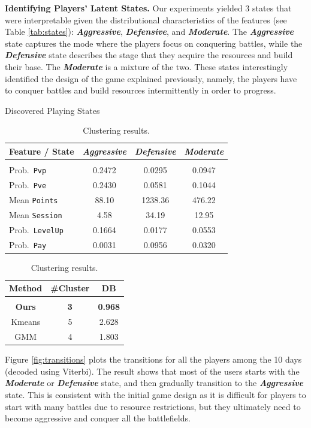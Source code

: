 {\bf Identifying Players' Latent States.} Our experiments yielded 3 states that were interpretable given the distributional characteristics of the features (see 
Table \ref{tab:states}): \textbf{\textit{Aggressive}}, 
\textbf{\textit{Defensive}}, and \textbf{\textit{Moderate}}.  The \textbf{\textit{Aggressive}} state captures 
the mode where the players focus on conquering battles, while the \textbf{\textit{Defensive}} 
state describes the stage that they acquire the resources and build their base. The \textbf{\textit{Moderate}} is a mixture
of the two. These states interestingly identified the design of the game explained previously,
namely, the players have to conquer battles and build resources intermittently in order to progress. 

\begin{table}
\parbox{.65\linewidth}{
\centering
\caption{Discovered Playing States}
\label{tab:states}
\centering
\scalebox{0.8}
{
\begin{tabular}{lccc} 
\bf Feature / State & \textbf{\textit{Aggressive}}  & \textbf{\textit{Defensive}}  &  \textbf{\textit{Moderate}}
\\ \hline \\
 Prob.\ \texttt{Pvp}     &  0.2472  & 0.0295 &  0.0947  \\
 Prob.\ \texttt{Pve}     &  0.2430  & 0.0581 &  0.1044 \\
 Mean \texttt{Points} &  88.10   & 1238.36 &  476.22 \\
 Mean \texttt{Session}&  4.58    &  34.19  & 12.95 \\
 Prob.\ \texttt{LevelUp} &  0.1664  & 0.0177  & 0.0553 \\
 Prob.\ \texttt{Pay}     &  0.0031  & 0.0956  & 0.0320 \\
\end{tabular}
}
}
\hfill
\parbox{.35\linewidth}{
\centering
\caption{Clustering results.}
\label{tab:clustering}
\begin{tabular}{ccc}
\bf Method & \bf \#Cluster & \bf DB
\\ \hline \\
{\bf Ours}     & {\bf 3}  &  {\bf 0.968} \\  
Kmeans  &  5  &  2.628 \\
GMM     &  4  &  1.803 
\end{tabular}
}
\end{table}

Figure \ref{fig:transitions} plots the transitions for all the players among the 10 days (decoded using Viterbi). 
The result shows that most of the users starts with the \textbf{\textit{Moderate}} or \textbf{\textit{Defensive}} state, 
and then gradually transition to the \textbf{\textit{Aggressive}} state. 
This is  consistent with the initial game design as  it is difficult for players  to start with many battles due to  resource restrictions, but they ultimately need to become aggressive and conquer all the battlefields.

